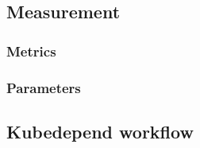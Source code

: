 \subsection{Measurement} \label{test-impl-measurement}


\subsubsection{Metrics}

%	

\subsubsection{Parameters}

\subsection{Kubedepend workflow}

